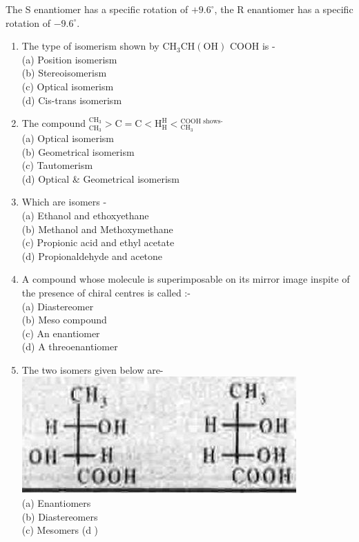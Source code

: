\documentclass[10pt]{article}
\begin{document}
The S enantiomer has a specific rotation of $+9.6^{\circ}$, the R enantiomer has a specific rotation of $-9.6^{\circ}$.

\begin{enumerate}
  \item The type of isomerism shown by $\mathrm{CH}_{3} \mathrm{CH}(\mathrm{OH})$ COOH is -\\
(a) Position isomerism\\
(b) Stereoisomerism\\
(c) Optical isomerism\\
(d) Cis-trans isomerism
  \item The compound ${ }_{\mathrm{CH}_{3}}^{\mathrm{CH}_{3}}>\mathrm{C}=\mathrm{C}<\mathrm{H}_{\mathrm{H}}^{\mathrm{H}}<{ }_{\mathrm{CH}_{3}}^{\mathrm{COOH} \text { shows- }}$\\
(a) Optical isomerism\\
(b) Geometrical isomerism\\
(c) Tautomerism\\
(d) Optical \& Geometrical isomerism
  \item Which are isomers -\\
(a) Ethanol and ethoxyethane\\
(b) Methanol and Methoxymethane\\
(c) Propionic acid and ethyl acetate\\
(d) Propionaldehyde and acetone
  \item A compound whose molecule is superimposable on its mirror image inspite of the presence of chiral centres is called :-\\
(a) Diastereomer\\
(b) Meso compound\\
(c) An enantiomer\\
(d) A threoenantiomer
  \item The two isomers given below are-\\
\includegraphics[max width=\textwidth, center]{2025_01_28_8470952b98110cec3aabg-063}\\
(a) Enantiomers\\
(b) Diastereomers\\
(c) Mesomers (d )
\end{enumerate}
\end{document}
